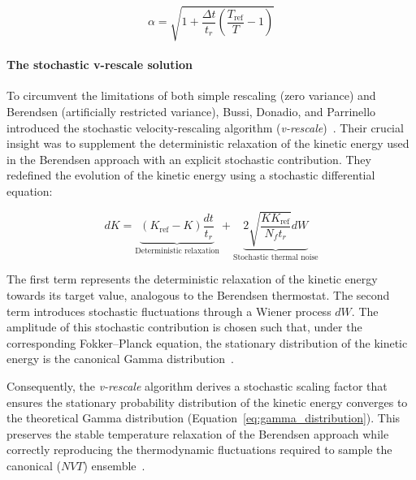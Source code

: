 \begin{equation}
    \alpha
    =
    \sqrt{
        1+
        \frac{\Delta t}{t_r}
        \left(
            \frac{T_{\mathrm{ref}}}{T}-1
        \right)
    }
\end{equation}

\paragraph{The stochastic v-rescale solution}

To circumvent the limitations of both simple rescaling (zero variance) and Berendsen (artificially restricted variance), Bussi, Donadio, and Parrinello introduced the stochastic velocity-rescaling algorithm (\textit{v-rescale})~\cite{Vresc}. Their crucial insight was to supplement the deterministic relaxation of the kinetic energy used in the Berendsen approach with an explicit stochastic contribution.
They redefined the evolution of the kinetic energy using a stochastic differential equation:


\begin{equation}\label{eq:vrescale}
    dK = \underbrace{(K_{\text{ref}} - K)\frac{dt}{t_r}}_{\text{Deterministic relaxation}} + \underbrace{2\sqrt{\frac{K K_{\text{ref}}}{N_f t_r}} dW}_{\text{Stochastic thermal noise}}
\end{equation}

The first term represents the deterministic relaxation of the kinetic energy towards its target value, analogous to the Berendsen thermostat. The second term introduces stochastic fluctuations through a Wiener process $dW$. The amplitude of this stochastic contribution is chosen such that, under the corresponding Fokker--Planck equation, the stationary distribution of the kinetic energy is the canonical Gamma distribution~\cite{Vresc}.

Consequently, the \textit{v-rescale} algorithm derives a stochastic scaling factor that ensures the stationary probability distribution of the kinetic energy converges to the theoretical Gamma distribution (Equation~\ref{eq:gamma_distribution}). This preserves the stable temperature relaxation of the Berendsen approach while correctly reproducing the thermodynamic fluctuations required to sample the canonical ($NVT$) ensemble~\cite{Vresc}.















